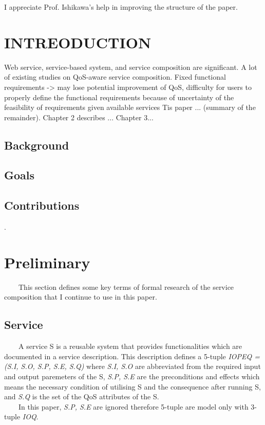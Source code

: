 \documentclass[senior,final,11pt]{iscs-thesis}
\begin{document}
\begin{acknowledge}
I appreciate Prof. Ishikawa's help in improving the structure of the paper.
\end{acknowledge}

\frontmatter 
\tableofcontents
\mainmatter 

\chapter{INTREODUCTION}
Web service, service-based system, and service composition are significant.
A lot of existing studies on QoS-aware service composition.
Fixed functional requirements -> may lose potential improvement of QoS, difficulty for users to properly define the functional requirements because of uncertainty of the feasibility of requirements given available services
Tis paper ... (summary of the remainder).
Chapter 2 describes ... Chapter 3...
\section{Background}
\section{Goals}
\section{Contributions}
\cite{4065825}. 
\chapter{Preliminary}%
~~~~This section defines some key terms of formal research of the service composition that I continue to use in this paper.
\section{Service}
~~~~A service S is a reusable system that provides functionalities which are documented in a service description. This description defines a 5-tuple {\em IOPEQ = (S.I, S.O, S.P, S.E, S.Q)} where {\em S.I, S.O} are abbreviated from the required input and output paremeters of the S, {\em S.P, S.E} are the preconditions and effects which means the necessary condition of utilising S and the consequence after running S, and {\em S.Q} is the set of the QoS attributes of the S. \\
~~~~In this paper, {\em S.P, S.E} are ignored therefore 5-tuple are model only with 3-tuple {\em IOQ}.
\end{document}
